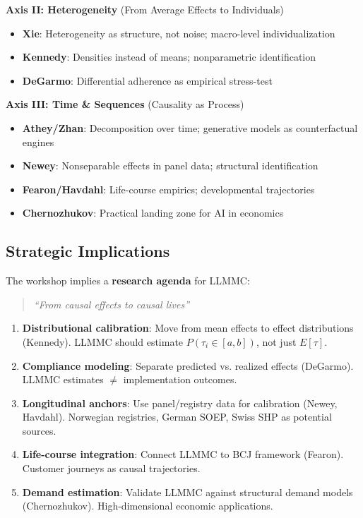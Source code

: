 \textbf{Axis II: Heterogeneity} (From Average Effects to Individuals)
\begin{itemize}[nosep]
\item \textbf{Xie}: Heterogeneity as structure, not noise; macro-level individualization
\item \textbf{Kennedy}: Densities instead of means; nonparametric identification
\item \textbf{DeGarmo}: Differential adherence as empirical stress-test
\end{itemize}

\textbf{Axis III: Time \& Sequences} (Causality as Process)
\begin{itemize}[nosep]
\item \textbf{Athey/Zhan}: Decomposition over time; generative models as counterfactual engines
\item \textbf{Newey}: Nonseparable effects in panel data; structural identification
\item \textbf{Fearon/Havdahl}: Life-course empirics; developmental trajectories
\item \textbf{Chernozhukov}: Practical landing zone for AI in economics
\end{itemize}

\subsection{Strategic Implications}

The workshop implies a \textbf{research agenda} for LLMMC:

\begin{quote}
\emph{``From causal effects to causal lives''}
\end{quote}

\begin{enumerate}
\item \textbf{Distributional calibration}: Move from mean effects to effect distributions
(Kennedy). LLMMC should estimate $P(\tau_i \in [a,b])$, not just $E[\tau]$.

\item \textbf{Compliance modeling}: Separate predicted vs. realized effects (DeGarmo).
LLMMC estimates $\neq$ implementation outcomes.

\item \textbf{Longitudinal anchors}: Use panel/registry data for calibration (Newey, Havdahl).
Norwegian registries, German SOEP, Swiss SHP as potential sources.

\item \textbf{Life-course integration}: Connect LLMMC to BCJ framework (Fearon).
Customer journeys as causal trajectories.

\item \textbf{Demand estimation}: Validate LLMMC against structural demand models (Chernozhukov).
High-dimensional economic applications.
\end{enumerate}


